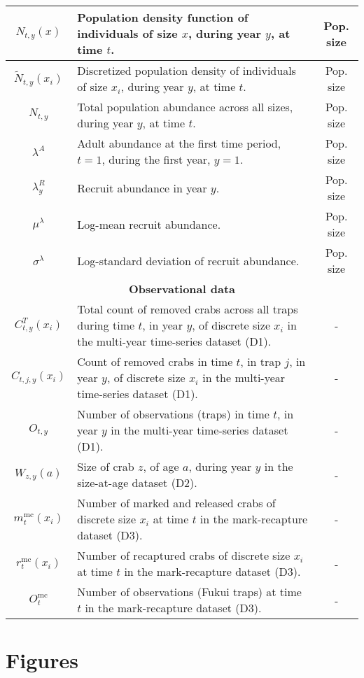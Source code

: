 \documentclass{article}
\begin{document}
\begin{longtable}{||c p{9cm} c||}
 \hline
 $N_{t,y}(x)$ & Population density function of individuals of size $x$, during year $y$, at time $t$. & Pop. size \\ 
 \hline
 $\tilde{N}_{t,y}(x_i)$ & Discretized population density of individuals of size $x_i$, during year $y$, at time $t$. & Pop. size \\ 
 \hline
 $N_{t,y}$ & Total population abundance across all sizes, during year $y$, at time $t$. & Pop. size \\
 \hline
 $\lambda^A$ & Adult abundance at the first time period, $t=1$, during the first year, $y=1$. & Pop. size \\
 \hline
 $\lambda^R_y$ & Recruit abundance in year $y$. & Pop. size \\
 \hline
 $\mu^{\lambda}$ & Log-mean recruit abundance. & Pop. size \\
 \hline
 $\sigma^{\lambda}$ & Log-standard deviation of recruit abundance. & Pop. size \\
 \hline\hline
 \multicolumn{3}{||c||}{\textbf{Observational data}} \\ 
 \hline
 $C^T_{t,y}(x_i)$ & Total count of removed crabs across all traps during time $t$, in year $y$, of discrete size $x_i$ in the multi-year time-series dataset (D1). & - \\ 
 \hline
 $C_{t,j,y}(x_i)$ & Count of removed crabs in time $t$, in trap $j$, in year $y$, of discrete size $x_i$ in the multi-year time-series dataset (D1). & - \\
 \hline
 $O_{t,y}$ & Number of observations (traps) in time $t$, in year $y$ in the multi-year time-series dataset (D1). & - \\
 \hline
 $W_{z, y}(a)$ & Size of crab $z$, of age $a$, during year $y$ in the size-at-age dataset (D2). & - \\
 \hline
 $m^{\text{mc}}_t(x_i)$ & Number of marked and released crabs of discrete size $x_i$ at time $t$ in the mark-recapture dataset (D3). & - \\
 \hline
 $r^{\text{mc}}_t(x_i)$ & Number of recaptured crabs of discrete size $x_i$ at time $t$ in the mark-recapture dataset (D3). & - \\
 \hline
 $O^{\text{mc}}_t$ & Number of observations (Fukui traps) at time $t$ in the mark-recapture dataset (D3). & - \\
 \hline
\end{longtable}

\section{Figures}
\end{document}
